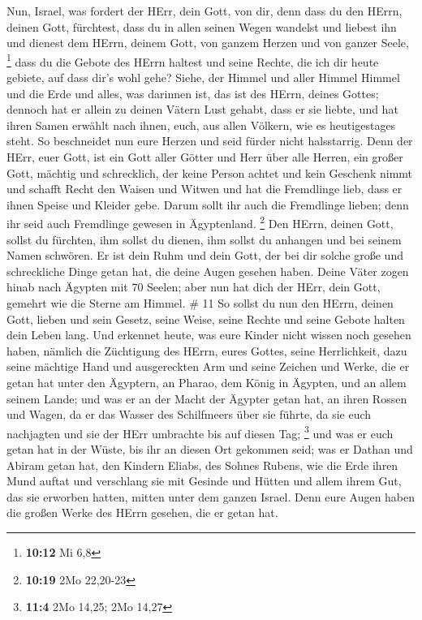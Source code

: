  Nun, Israel, was fordert der HErr, dein Gott, von dir,
denn dass du den HErrn, deinen Gott, fürchtest, dass du in allen seinen
Wegen wandelst und liebest ihn und dienest dem HErrn, deinem Gott, von
ganzem Herzen und von ganzer Seele, \footnote{\textbf{10:12} Mi 6,8}
 dass du die Gebote des HErrn haltest und seine Rechte, die
ich dir heute gebiete, auf dass dir's wohl gehe?  Siehe,
der Himmel und aller Himmel Himmel und die Erde und alles, was darinnen
ist, das ist des HErrn, deines Gottes;  dennoch hat er
allein zu deinen Vätern Lust gehabt, dass er sie liebte, und hat ihren
Samen erwählt nach ihnen, euch, aus allen Völkern, wie es heutigestages
steht.  So beschneidet nun eure Herzen und seid fürder
nicht halsstarrig.  Denn der HErr, euer Gott, ist ein Gott
aller Götter und Herr über alle Herren, ein großer Gott, mächtig und
schrecklich, der keine Person achtet und kein Geschenk nimmt
 und schafft Recht den Waisen und Witwen und hat die
Fremdlinge lieb, dass er ihnen Speise und Kleider gebe. 
Darum sollt ihr auch die Fremdlinge lieben; denn ihr seid auch
Fremdlinge gewesen in Ägyptenland. \footnote{\textbf{10:19} 2Mo 22,20-23}
 Den HErrn, deinen Gott, sollst du fürchten, ihm sollst du
dienen, ihm sollst du anhangen und bei seinem Namen schwören.
 Er ist dein Ruhm und dein Gott, der bei dir solche große
und schreckliche Dinge getan hat, die deine Augen gesehen haben.
 Deine Väter zogen hinab nach Ägypten mit 70 Seelen; aber
nun hat dich der HErr, dein Gott, gemehrt wie die Sterne am Himmel. \#
11  So sollst du nun den HErrn, deinen Gott, lieben und sein
Gesetz, seine Weise, seine Rechte und seine Gebote halten dein Leben
lang.  Und erkennet heute, was eure Kinder nicht wissen noch
gesehen haben, nämlich die Züchtigung des HErrn, eures Gottes, seine
Herrlichkeit, dazu seine mächtige Hand und ausgereckten Arm 
und seine Zeichen und Werke, die er getan hat unter den Ägyptern, an
Pharao, dem König in Ägypten, und an allem seinem Lande; 
und was er an der Macht der Ägypter getan hat, an ihren Rossen und
Wagen, da er das Wasser des Schilfmeers über sie führte, da sie euch
nachjagten und sie der HErr umbrachte bis auf diesen Tag; \footnote{\textbf{11:4}
  2Mo 14,25; 2Mo 14,27}  und was er euch getan hat in der
Wüste, bis ihr an diesen Ort gekommen seid;  was er Dathan
und Abiram getan hat, den Kindern Eliabs, des Sohnes Rubens, wie die
Erde ihren Mund auftat und verschlang sie mit Gesinde und Hütten und
allem ihrem Gut, das sie erworben hatten, mitten unter dem ganzen
Israel.  Denn eure Augen haben die großen Werke des HErrn
gesehen, die er getan hat.

